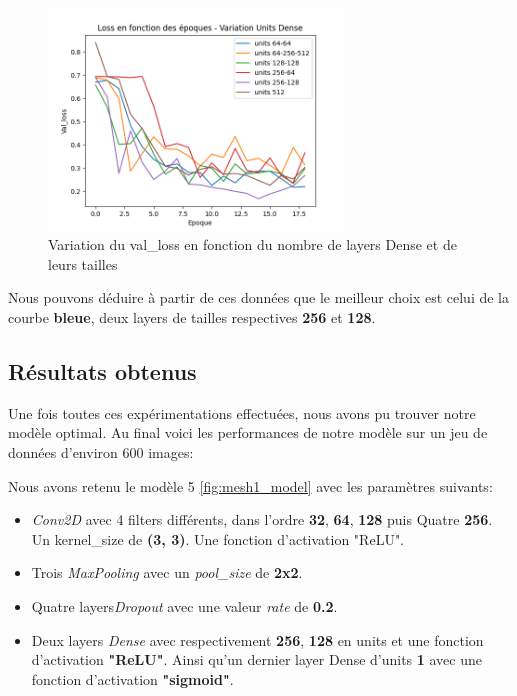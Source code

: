 \documentclass{rapport}
\begin{document}
        \begin{figure}[H]
            \centering
            \includegraphics[width=0.7\textwidth]{rapport/plots/dense_loss.png}
            \caption{Variation du val\_loss en fonction du nombre de layers Dense et de leurs tailles}
            \label{fig:mesh2}
        \end{figure}
        
        Nous pouvons déduire à partir de ces données que le meilleur choix est celui de la courbe \textbf{bleue}, deux layers de tailles respectives \textbf{256} et \textbf{128}.
    
        \subsection{Résultats obtenus}
        Une fois toutes ces expérimentations effectuées, nous avons pu trouver notre modèle optimal. Au final voici les performances de notre modèle sur un jeu de données d'environ 600 images\space:
        
        Nous avons retenu le modèle 5 \ref{fig:mesh1_model} avec les paramètres suivants:
        
        \begin{itemize}
            \item \textit{Conv2D} avec 4 filters différents, dans l'ordre \textbf{32}, \textbf{64}, \textbf{128} puis Quatre \textbf{256}. Un kernel\_size de \textbf{(3, 3)}. Une fonction d'activation "ReLU".
            
            \item Trois \textit{MaxPooling} avec un \textit{pool\_size} de \textbf{2x2}.
            
            \item Quatre layers\textit{Dropout} avec une valeur \textit{rate} de \textbf{0.2}.
            
            \item Deux layers \textit{Dense} avec respectivement \textbf{256}, \textbf{128} en units et une fonction d'activation \textbf{"ReLU"}. Ainsi qu'un dernier layer Dense d'units \textbf{1} avec une fonction d'activation \textbf{"sigmoid"}.
        \end{itemize}
        
\end{document}
